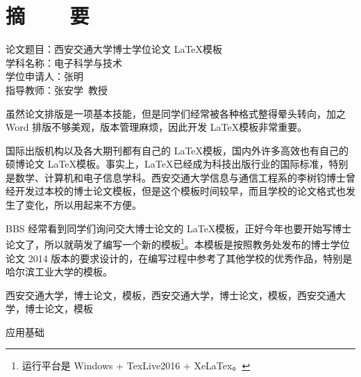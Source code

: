 
\titlespacing{\chapter}{0pt}{23mm}{6mm}
\chapter*{摘~~~~要}
\setcounter{page}{1}

\vskip-50mm
{\hei
	\noindent 论文题目：西安交通大学博士学位论文 \LaTeX 模板 \\
	\noindent 学科名称：电子科学与技术 \\
	\noindent 学位申请人：张明 \\
	\noindent 指导教师：张安学~教授
}
\vskip22mm

虽然论文排版是一项基本技能，但是同学们经常被各种格式整得晕头转向，加之 Word 排版不够美观，版本管理麻烦，因此开发 \LaTeX 模板非常重要。

国际出版机构以及各大期刊都有自己的 \LaTeX 模板，国内外许多高效也有自己的硕博论文 \LaTeX 模板。事实上，\LaTeX 已经成为科技出版行业的国际标准，特别是数学、计算机和电子信息学科。西安交通大学信息与通信工程系的李树钧博士曾经开发过本校的博士论文模板，但是这个模板时间较早，而且学校的论文格式也发生了变化，所以用起来不方便。

BBS 经常看到同学们询问交大博士论文的 \LaTeX 模板，正好今年也要开始写博士论文了，所以就萌发了编写一个新的模板\footnote{运行平台是 \color{red}Windows + TexLive2016 + XeLaTex。}。本模板是按照教务处发布的博士学位论文 2014 版本的要求设计的，在编写过程中参考了其他学校的优秀作品，特别是哈尔滨工业大学的模板。

\vspace{\baselineskip}
\hangindent=62pt
 西安交通大学，博士论文，模板，西安交通大学，博士论文，模板，西安交通大学，博士论文，模板

\vspace{\baselineskip}
 应用基础
\clearpage

